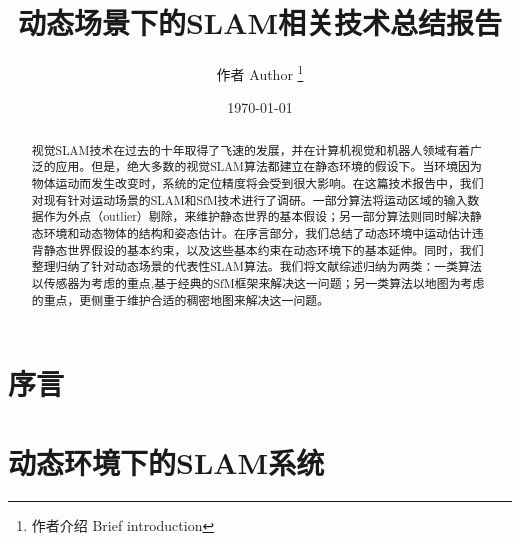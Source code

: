 \documentclass[12pt,a4paper]{article}
\title{动态场景下的SLAM相关技术总结报告}
\author{ 作者 Author \thanks{作者介绍 Brief introduction} }
\date{\today}
\begin{document}
\begin{abstract}
	视觉SLAM技术在过去的十年取得了飞速的发展，并在计算机视觉和机器人领域有着广泛的应用。但是，绝大多数的视觉SLAM算法都建立在静态环境的假设下。当环境因为物体运动而发生改变时，系统的定位精度将会受到很大影响。在这篇技术报告中，我们对现有针对运动场景的SLAM和SfM技术进行了调研。一部分算法将运动区域的输入数据作为外点（outlier）剔除，来维护静态世界的基本假设；另一部分算法则同时解决静态环境和动态物体的结构和姿态估计。在序言部分，我们总结了动态环境中运动估计违背静态世界假设的基本约束，以及这些基本约束在动态环境下的基本延伸。同时，我们整理归纳了针对动态场景的代表性SLAM算法。我们将文献综述归纳为两类：一类算法以传感器为考虑的重点,基于经典的SfM框架来解决这一问题；另一类算法以地图为考虑的重点，更侧重于维护合适的稠密地图来解决这一问题。	
\end{abstract}

\maketitle
\section{序言}
\label{sec:preliminaries}

\section{动态环境下的SLAM系统}
\label{sec:slam}

%
%
%
%


%
%
%



	
\end{document}

